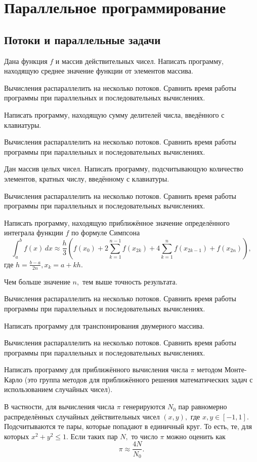 \section{Параллельное программирование}

\subsection{Потоки и параллельные задачи}

\task Дана функция $f$ и массив действительных чисел. Написать
программу, находящую среднее значение функции от элементов
массива.

Вычисления распараллелить на несколько потоков. Сравнить время работы
программы при параллельных и последовательных вычислениях.

\task Написать программу, находящую сумму делителей числа, введённого
с клавиатуры.


Вычисления распараллелить на несколько потоков. Сравнить время работы
программы при параллельных и последовательных вычислениях.

\task Дан массив целых чисел. Написать программу, подсчитывающую
количество элементов, кратных числу, введённому с клавиатуры.

Вычисления распараллелить на несколько потоков. Сравнить время работы
программы при параллельных и последовательных вычислениях.

\task Написать программу, находящую приближённое значение
определённого интеграла функции $f$ по формуле Симпсона
\[
\int_a^b f(x)\,dx \approx \frac{h}3 \left(
  f(x_0) + 2\sum_{k=1}^{n-1} f(x_{2k}) + 4\sum_{k=1}^n f(x_{2k-1}) + f(x_{2n})
\right),
\]
где $h = \frac{b-a}{2n}, x_k=a+kh.$ 

Чем больше значение $n,$ тем выше точность результата.

Вычисления распараллелить на несколько потоков. Сравнить время работы
программы при параллельных и последовательных вычислениях.

\task Написать программу для транспонирования двумерного массива.

Вычисления распараллелить на несколько потоков. Сравнить время работы
программы при параллельных и последовательных вычислениях.

\task Написать программу для приближённого вычисления числа $\pi$
методом Монте-Карло (это группа методов для приближённого решения
математических задач с использованием случайных чисел).

В частности, для вычисления числа $\pi$ генерируются $N_0$ пар
равномерно распределённых случайных действительных чисел
$(x, y),$ где $x, y \in [-1, 1].$ Подсчитываются те пары, которые попадают в
единичный круг. То есть, те, для которых $x^2+y^2 \leqslant 1.$ Если
таких пар $N,$ то число $\pi$ можно оценить как
\[
\pi \approx \frac{4N}{N_0}.
\]

